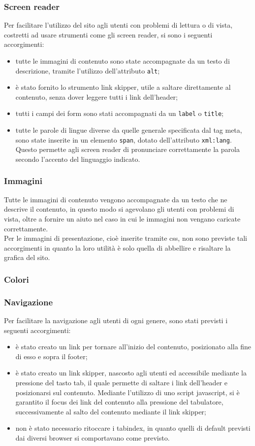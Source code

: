 		\subsubsection{Screen reader}
		Per facilitare l'utilizzo del sito agli utenti con problemi di lettura o di vista, costretti ad usare strumenti come gli screen reader, si sono i seguenti accorgimenti:
		\begin{itemize}
			\item tutte le immagini di contenuto sono state accompagnate da un testo di descrizione, tramite l'utilizzo dell'attributo \texttt{alt};
			\item è stato fornito lo strumento link skipper, utile a saltare direttamente al contenuto, senza dover leggere tutti i link dell'header;
			\item tutti i campi dei form sono stati accompagnati da un \texttt{label} o \texttt{title};
			\item tutte le parole di lingue diverse da quelle generale specificata dal tag meta, sono state inserite in un elemento \texttt{span}, dotato dell'attributo \texttt{xml:lang}. Questo permette agli screen reader di pronunciare correttamente la parola secondo l'accento del linguaggio indicato.
		\end{itemize}
		\subsubsection{Immagini}
		Tutte le immagini di contenuto vengono accompagnate da un testo che ne descrive il contenuto, in questo modo si agevolano gli utenti con problemi di vista, oltre a fornire un aiuto nel caso in cui le immagini non vengano caricate correttamente. \\
		Per le immagini di presentazione, cioè inserite tramite css, non sono previste tali accorgimenti in quanto la loro utilità è solo quella di abbellire e risaltare la grafica del sito.
		\subsubsection{Colori}
		
		\subsubsection{Navigazione}
		Per facilitare la navigazione agli utenti di ogni genere, sono stati previsti i seguenti accorgimenti:
		\begin{itemize}
			\item è stato creato un link per tornare all'inizio del contenuto, posizionato alla fine di esso e sopra il footer;
			\item è stato creato un link skipper, nascosto agli utenti ed accessibile mediante la pressione del tasto tab, il quale permette di saltare i link dell'header e posizionarsi sul contenuto. Mediante l'utilizzo di uno script javascript, si è garantito il focus dei link del contenuto alla pressione del tabulatore, successivamente al salto del contenuto mediante il link skipper;
			\item non è stato necessario ritoccare i tabindex, in quanto quelli di default previsti dai diversi browser si comportavano come previsto.
		\end{itemize}
